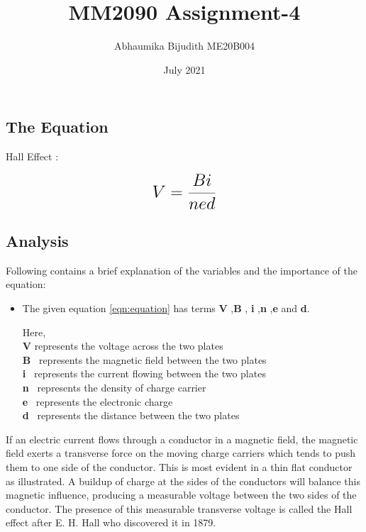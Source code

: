 \documentclass[a4paper, 12pt]{article}
\begin{document}
\title{MM2090 Assignment-4}
\author{Abhaumika Bijudith ME20B004}
\date{July 2021}
\maketitle

\subsection{The Equation}

Hall Effect  :  

\begin{equation}
 {\LARGE{\textbf{$V =\frac{Bi}{{ned}}$}}}
 \label{eqn:equation}
\end{equation}


\subsection{Analysis}
Following contains a brief explanation of the variables and the importance of the equation:
\begin{itemize}
\item {\normalsize {The given equation \ref{eqn:equation} has terms \textbf{V} ,\textbf{B} , \textbf{i} ,\textbf{n} ,\textbf{e} and  \textbf{d}.}}

{ Here,}\\
{\normalsize{\textbf{V} represents the voltage across the two plates }}\\
{\normalsize{\textbf{B} \  represents the magnetic field between the two plates}}\\
{\normalsize{\textbf{i} \  represents the current flowing between the two plates}}\\
{\normalsize{\textbf{n} \  represents the density of charge carrier}}\\
{\normalsize{\textbf{e} \ represents the electronic charge}}\\
{\normalsize{\textbf{d} \ represents the distance between the two plates}}
\end{itemize}

If an electric current flows through a conductor in a magnetic field, the magnetic field exerts a transverse force on the moving charge carriers which tends to push them to one side of the conductor. This is most evident in a thin flat conductor as illustrated. A buildup of charge at the sides of the conductors will balance this magnetic influence, producing a measurable voltage between the two sides of the conductor. The presence of this measurable transverse voltage is called the Hall effect after E. H. Hall who discovered it in 1879. \cite{weblink1}
\end{document}
